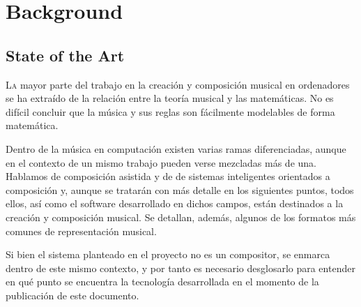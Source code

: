 \chapter{Background}
\label{chap:background}
\vspace{0.5cm}


\section{State of the Art}
\label{sec:state-of-the-art}

\lettrine{L}a mayor parte del trabajo en la creación y composición musical en ordenadores se ha extraído de la relación entre la teoría musical y las matemáticas. No es difícil concluir que la música y sus reglas son fácilmente modelables de forma matemática. 

Dentro de la música en computación existen varias ramas diferenciadas, aunque en el contexto de un mismo trabajo pueden verse mezcladas más de una. Hablamos de composición asistida y de de sistemas inteligentes orientados a composición y, aunque se tratarán con más detalle en los siguientes puntos, todos ellos, así como el software desarrollado en dichos campos, están destinados a la creación y composición musical. Se detallan, además, algunos de los formatos más comunes de representación musical.

Si bien el sistema planteado en el proyecto no es un compositor, se enmarca dentro de este mismo contexto, y por tanto es necesario desglosarlo para entender en qué punto se encuentra la tecnología desarrollada en el momento de la publicación de este documento.

